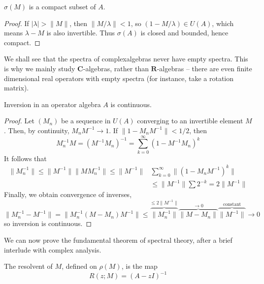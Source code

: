 \begin{theorem}
    $\sigma(M)$ is a compact subset of $A$.
\end{theorem}
\begin{proof}
    If $|\lambda| > \|M\|$, then $\| M/\lambda \| < 1$, so $(1 - M/\lambda) \in U(A)$, which means $\lambda - M$ is also invertible. Thus $\sigma(A)$ is closed and bounded, hence compact.
\end{proof}

We shall see that the spectra of complexalgebras never have empty spectra. This is why we mainly study $\mathbf{C}$-algebras, rather than $\mathbf{R}$-algebras -- there are even finite dimensional real operators with empty spectra (for instance, take a rotation matrix).

\begin{lemma}
    Inversion in an operator algebra $A$ is continuous.
\end{lemma}
\begin{proof}
    Let $(M_n)$ be a sequence in $U(A)$ converging to an invertible element $M$. Then, by continuity, $M_nM^{-1} \to 1$. If $\| 1 - M_n M^{-1} \| < 1/2$, then
    \[ M_n^{-1} M = (M^{-1}M_n)^{-1} = \sum_{k = 0}^\infty (1 - M^{-1}M_n)^k \]
    It follows that
    \begin{align*}
        \| M_n^{-1} \| \leq \| M^{-1} \| \| M M_n^{-1} \| \leq \| M^{-1} \| &\sum_{k = 0}^\infty \| (1 - M_nM^{-1})^k \|\\
        &\leq \| M^{-1} \| \sum 2^{-k} = 2 \| M^{-1} \|
    \end{align*}
    Finally, we obtain convergence of inverses,
    \[ \| M_n^{-1} - M^{-1} \| = \| M_n^{-1} (M - M_n) M^{-1} \| \leq \overbrace{\| M_n^{-1} \|}^{\leq 2 \| M^{-1} \|} \overbrace{\| M - M_n \|}^{\to 0} \overbrace{\| M^{-1} \|}^{\text{constant}} \to 0 \]
    so inversion is continuous.
\end{proof}

We can now prove the fundamental theorem of spectral theory, after a brief interlude with complex analysis.

\begin{definition}
    The resolvent of $M$, defined on $\rho(M)$, is the map
    \[ R(z; M) = (A - zI)^{-1} \]
\end{definition}

